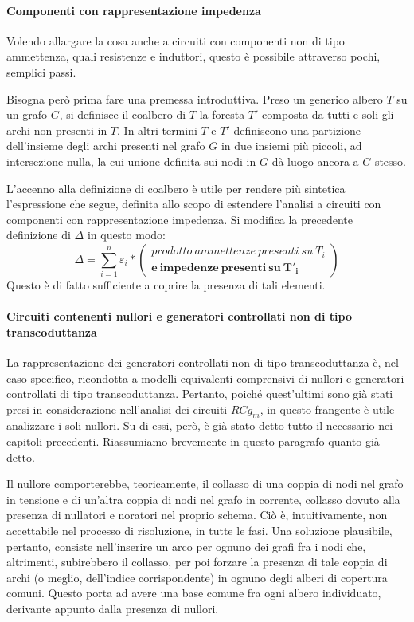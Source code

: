 \paragraph{Componenti con rappresentazione impedenza}
Volendo allargare la cosa anche a circuiti con componenti non di tipo ammettenza, quali resistenze e induttori, questo è possibile attraverso pochi, semplici passi.

Bisogna però prima fare una premessa introduttiva. Preso un generico albero $T$ su un grafo $G$, si definisce il coalbero di $T$ la foresta $T'$ composta da tutti e soli gli archi non presenti in $T$. In altri termini $T$ e $T'$ definiscono una partizione dell'insieme degli archi presenti nel grafo $G$ in due insiemi più piccoli, ad intersezione nulla, la cui unione definita sui nodi in $G$ dà luogo ancora a $G$ stesso.

L'accenno alla definizione di coalbero è utile per rendere più sintetica l'espressione che segue, definita allo scopo di estendere l'analisi a circuiti con componenti con rappresentazione impedenza. Si modifica la precedente definizione di $\Delta$ in questo modo:
$$
\Delta =
\sum_{i=1}^n{
  \varepsilon_i\ast\left(\begin{array}{c}
    prodotto~ammettenze~presenti~su~T_i\\ \boldsymbol{e~impedenze~presenti~su~T'_i}
  \end{array}\right)
}
$$
Questo è di fatto sufficiente a coprire la presenza di tali elementi.

\paragraph{Circuiti contenenti nullori e generatori controllati non di tipo transcoduttanza}
La rappresentazione dei generatori controllati non di tipo transcoduttanza è, nel caso specifico, ricondotta a modelli equivalenti comprensivi di nullori e generatori controllati di tipo transcoduttanza. Pertanto, poiché quest'ultimi sono già stati presi in considerazione nell'analisi dei circuiti $RCg_m$, in questo frangente è utile analizzare i soli nullori. Su di essi, però, è già stato detto tutto il necessario nei capitoli precedenti. Riassumiamo brevemente in questo paragrafo quanto già detto.

Il nullore comporterebbe, teoricamente, il collasso di una coppia di nodi nel grafo in tensione e di un'altra coppia di nodi nel grafo in corrente, collasso dovuto alla presenza di nullatori e noratori nel proprio schema. Ciò è, intuitivamente, non accettabile nel processo di risoluzione, in tutte le fasi. Una soluzione plausibile, pertanto, consiste nell'inserire un arco per ognuno dei grafi fra i nodi che, altrimenti, subirebbero il collasso, per poi forzare la presenza di tale coppia di archi (o meglio, dell'indice corrispondente) in ognuno degli alberi di copertura comuni. Questo porta ad avere una base comune fra ogni albero individuato, derivante appunto dalla presenza di nullori.

